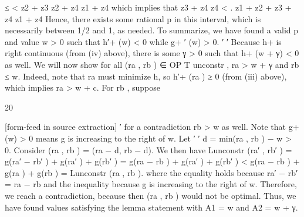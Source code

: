 \documentclass[10pt]{article}
\begin{document}
\begin{ReviewVerbatim}
                                             ≤         <
                                     z2 + z3   z2 + z4   z1 + z4
which implies that
                                          z3 + z4           z4
                                                       <         .
                                     z1 + z2 + z3 + z4   z1 + z4
Hence, there exists some rational p in this interval, which is necessarily between 1/2 and 1, as
needed.
To summarize, we have found a valid p and value w > 0 such that h′+ (w) < 0 while g+    ′
                                                                                          (w) > 0.
         ′                                                                        ′
Because h+ is right continuous (from (iv) above), there is some γ > 0 such that h+ (w + γ) < 0 as
well. We will now show for all (ra , rb ) ∈ OP T unconstr , ra > w + γ and rb ≤ w. Indeed, note that
ra must minimize h, so h′+ (ra ) ≥ 0 (from (iii) above), which implies ra > w + c. For rb , suppose


                                                    20

[form-feed in source extraction]
                                                ′
for a contradiction rb > w as well. Note that g+  (w) > 0 means g is increasing to the right of w. Let
                                       ′   ′
d = min(ra , rb ) − w > 0. Consider (ra , rb ) = (ra − d, rb − d). We then have
                           Lunconstr (ra′ , rb′ ) = g(ra′ − rb′ ) + g(ra′ ) + g(rb′ )
                                                = g(ra − rb ) + g(ra′ ) + g(rb′ )
                                                < g(ra − rb ) + g(ra ) + g(rb )
                                                = Lunconstr (ra , rb ).
where the equality holds because ra′ − rb′ = ra − rb and the inequality because g is increasing to the
right of w. Therefore, we reach a contradiction, because then (ra , rb ) would not be optimal. Thus,
we have found values satisfying the lemma statement with A1 = w and A2 = w + γ.
\end{ReviewVerbatim}
\end{document}
